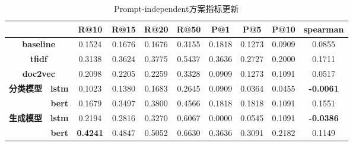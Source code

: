 \documentclass[11pt]{article}
\begin{document}
\begin{CJK}{UTF8}{gkai}
\begin{table}[htbp]
  \centering
  \begin{tabular}{c|c|c|c|c|c|c|c|c|c}
    \hline
    \multicolumn{2}{c|}{} & \textbf{R@10} & \textbf{R@15} & \textbf{R@20} & \textbf{R@50} & \textbf{P@1} & \textbf{P@5} & \textbf{P@10} & \textbf{spearman} \\
    \hline
    \multicolumn{2}{c|}{\textbf{baseline}} & 0.1524  & 0.1676  & 0.1676  & 0.3155  & 0.1818  & 0.1273  & 0.0909  & 0.0855  \\
    \hline
    \multicolumn{2}{c|}{\textbf{tfidf}} & 0.3138  & 0.3624  & 0.3775  & 0.5437  & 0.3636  & 0.2727  & 0.2000  & 0.1711  \\
    \hline
    \multicolumn{2}{c|}{\textbf{doc2vec}} & 0.2098  & 0.2205  & 0.2259  & 0.3328  & 0.0909  & 0.1273  & 0.1091  & 0.0517  \\
    \hline
    \multirow{2}[0]{*}{\textbf{分类模型}} & \textbf{lstm} & 0.1023  & 0.1380  & 0.1683  & 0.2645  & 0.0909  & 0.0364  & 0.0455  & \textcolor[rgb]{ 0,  .69,  .314}{\textbf{-0.0061 }} \\
    & \textbf{bert} & 0.1679  & 0.3497  & 0.3800  & 0.4566  & 0.1818  & 0.1818  & 0.1091  & 0.1551  \\
    \hline
    \multirow{2}[0]{*}{\textbf{生成模型}} & \textbf{lstm} & 0.2194  & 0.2816  & 0.3270  & 0.6067  & 0.0000  & 0.0545  & 0.1091  & \textcolor[rgb]{ 0,  .69,  .314}{\textbf{-0.0386 }} \\
    & \textbf{bert} & \textcolor[rgb]{ 1,  0,  0}{\textbf{0.4241 }} & 0.4847  & 0.5052  & 0.6630  & 0.3636  & 0.3091  & 0.2182  & 0.1149  \\
    \hline
  \end{tabular}%
  \caption{Prompt-independent方案指标更新}
  \label{tab:addlabel}%
\end{table}%


\end{CJK}
\end{document}

